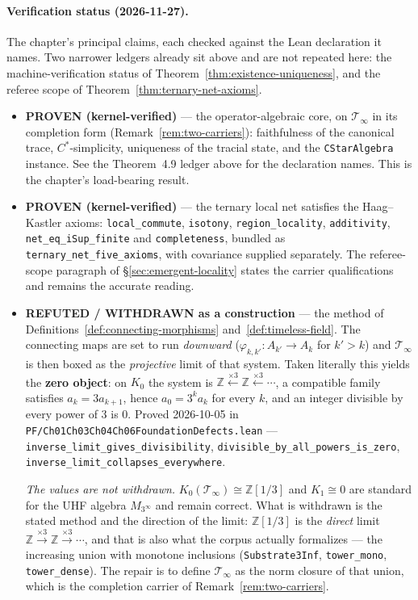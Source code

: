 \paragraph{Verification status (2026-11-27).}
The chapter's principal claims, each checked against the Lean declaration it
names. Two narrower ledgers already sit above and are not repeated here: the
machine-verification status of Theorem~\ref{thm:existence-uniqueness}, and the
referee scope of Theorem~\ref{thm:ternary-net-axioms}.
\begin{itemize}

\item \textbf{PROVEN (kernel-verified)} --- the operator-algebraic core, on
$\mathcal{T}_\infty$ in its completion form (Remark~\ref{rem:two-carriers}):
faithfulness of the canonical trace, $C^*$-simplicity, uniqueness of the
tracial state, and the \texttt{CStarAlgebra} instance. See the Theorem~4.9
ledger above for the declaration names. This is the chapter's load-bearing
result.

\item \textbf{PROVEN (kernel-verified)} --- the ternary local net satisfies the
Haag--Kastler axioms: \texttt{local\_commute}, \texttt{isotony},
\texttt{region\_locality}, \texttt{additivity}, \texttt{net\_eq\_iSup\_finite}
and \texttt{completeness}, bundled as
\texttt{ternary\_net\_five\_axioms}, with covariance supplied separately. The
referee-scope paragraph of \S\ref{sec:emergent-locality} states the carrier
qualifications and remains the accurate reading.

\item \textbf{REFUTED / WITHDRAWN as a construction} --- the method of
Definitions~\ref{def:connecting-morphisms} and~\ref{def:timeless-field}. The
connecting maps are set to run \emph{downward} ($\varphi_{k,k'} : A_{k'} \to
A_k$ for $k' > k$) and $\mathcal{T}_\infty$ is then boxed as the
\emph{projective} limit of that system. Taken literally this yields the
\textbf{zero object}: on $K_0$ the system is $\mathbb{Z}
\xleftarrow{\times 3} \mathbb{Z} \xleftarrow{\times 3} \cdots$, a compatible
family satisfies $a_k = 3a_{k+1}$, hence $a_0 = 3^k a_k$ for every $k$, and an
integer divisible by every power of $3$ is $0$. Proved 2026-10-05 in
\texttt{PF/Ch01Ch03Ch04Ch06Foundation\-Defects.lean} ---
\texttt{inverse\_limit\_gives\_divisibility},
\texttt{divisible\_by\_all\_powers\_is\_zero},
\texttt{inverse\_limit\_collapses\_everywhere}.

\emph{The values are not withdrawn.} $K_0(\mathcal{T}_\infty) \cong
\mathbb{Z}[1/3]$ and $K_1 \cong 0$ are standard for the UHF algebra
$M_{3^\infty}$ and remain correct. What is withdrawn is the stated method and
the direction of the limit: $\mathbb{Z}[1/3]$ is the \emph{direct} limit
$\mathbb{Z} \xrightarrow{\times 3} \mathbb{Z} \xrightarrow{\times 3} \cdots$,
and that is also what the corpus actually formalizes --- the increasing union
with monotone inclusions (\texttt{Substrate3Inf}, \texttt{tower\_mono},
\texttt{tower\_dense}). The repair is to define $\mathcal{T}_\infty$ as the
norm closure of that union, which is the completion carrier of
Remark~\ref{rem:two-carriers}.


\end{itemize}
